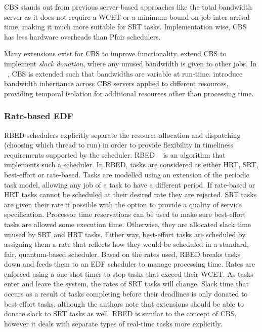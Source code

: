 \gls{CBS} stands out from previous server-based approaches like the total bandwidth
server\citep{Spuri_Buttazzo_94} as it does not require a \gls{WCET} or a minimum
bound on job inter-arrival time, making it much more suitable for \gls{SRT} tasks.  Implementation
wise, \gls{CBS} has less hardware overheads than Pfair schedulers.

Many extensions exist for \gls{CBS} to improve functionality.  \citet{Kato_IR_11} extend \gls{CBS} to
implement \emph{slack donation}, where any unused bandwidth is given to other jobs.  In
~\citep{Craciunas_KPRS_12}, \gls{CBS} is extended such that bandwidths are variable at run-time.
\citet{Lamastra_LA_01} introduce bandwidth inheritance across CBS servers applied to different
resources, providing temporal isolation for additional resources other than processing time.

\subsubsection{Rate-based EDF}

\Gls{RBED} schedulers explicitly separate the resource allocation and dispatching
(choosing which thread to run) in order to provide flexibility in timeliness requirements supported
by the scheduler.  \Gls{RBED} ~\citep{Brandt_BLB_03} is an algorithm that implements such a
scheduler.  In \gls{RBED}, tasks are considered as either \gls{HRT}, \gls{SRT}, best-effort or
rate-based.  Tasks are modelled using an extension of the periodic task model, allowing any job of a
task to have a different period.  If rate-based or \gls{HRT} tasks cannot be scheduled at their
desired rate they are rejected.  \gls{SRT} tasks are given their rate if possible with the option to
provide a quality of service specification.  Processor time reservations can be used to make sure
best-effort tasks are allowed some execution time.  Otherwise, they are allocated slack time unused
by SRT and HRT tasks.  Either way, best-effort tasks are scheduled by assigning them a rate that
reflects how they would be scheduled in a standard, fair, quantum-based scheduler.  Based on the
rates used, \gls{RBED} breaks tasks down and feeds them to an \gls{EDF} scheduler to manage
processing time.  Rates are enforced using a one-shot timer to stop tasks that exceed their
{\gls{WCET}}.  As tasks enter and leave the system, the rates of \gls{SRT} tasks will change.  Slack
time that occurs as a result of tasks completing before their deadlines is only donated to 
best-effort tasks, although the authors note that extensions should be able to donate slack to \gls{SRT}
tasks as well.  \Gls{RBED} is similar to the concept of \gls{CBS}, however it deals with separate types of
real-time tasks more explicitly.

